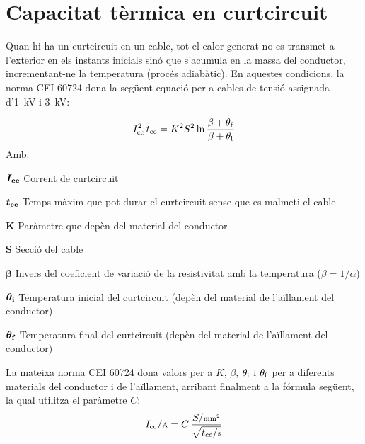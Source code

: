 \section{Capacitat tèrmica en curtcircuit}\label{ces:cables_Icc_termica}

Quan hi ha un curtcircuit en un cable, tot el calor generat no es transmet a l'exterior en els instants inicials sinó que s'acumula en la massa del conductor, incrementant-ne la temperatura (procés adiabàtic). En aquestes condicions, la norma CEI 60724 dona la següent equació per a cables de tensió assignada d'\SI{1}{kV} i \SI{3}{kV}:

\begin{equation}
   I\ped{cc}^2 \,t\ped{cc} = K^2 S^2 \ln \frac{\beta + \theta\ped{f}}{\beta + \theta\ped{i}}
\end{equation}
Amb:

\begin{list}{}
   {\setlength{\labelwidth}{10mm} \setlength{\leftmargin}{12mm} \setlength{\labelsep}{2mm}}
   \item[\hspace{5mm}$\boldsymbol{I\ped{cc}}$\hfill] Corrent de curtcircuit
   \item[\hspace{5mm}$\boldsymbol{t\ped{cc}}$\hfill] Temps màxim que pot durar el curtcircuit sense que es malmeti el cable
   \item[\hspace{5mm}$\boldsymbol{K}$\hfill] Paràmetre que depèn del material del conductor
   \item[\hspace{5mm}$\boldsymbol{S}$\hfill] Secció del cable
   \item[\hspace{5mm}$\boldsymbol{\beta}$\hfill] Invers del coeficient de variació de la resistivitat amb la temperatura ($\beta = 1/ \alpha$)
   \item[\hspace{5mm}$\boldsymbol{\theta\ped{i}}$\hfill] Temperatura inicial del curtcircuit (depèn del material de l'aïllament del conductor)
   \item[\hspace{5mm}$\boldsymbol{\theta\ped{f}}$\hfill] Temperatura final del curtcircuit (depèn del material de l'aïllament del conductor)
\end{list}

La mateixa norma CEI 60724 dona valors per a $K$, $\beta$, $\theta\ped{i}$ i $\theta\ped{f}$ per a diferents materials del conductor i de l'aïllament, arribant finalment a la fórmula següent, la qual utilitza el paràmetre $C$:
\begin{equation}\label{eq:Icc_termica}
   I\ped{cc}/{\scriptstyle\si{A}} = C\, \frac{S/{\scriptstyle\si{mm^2}}}{\sqrt{t\ped{cc}/{\scriptstyle\si{s}}}}
\end{equation}


